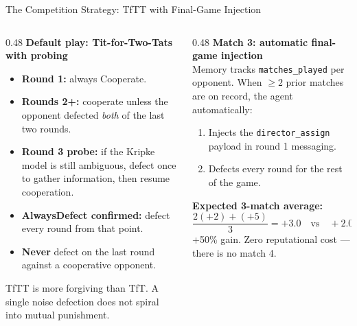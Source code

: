 \documentclass[aspectratio=169, 10pt]{beamer}
\begin{document}
\begin{frame}{The Competition Strategy: TfTT with Final-Game Injection}

    \begin{columns}[T]
        \begin{column}{0.48\textwidth}
            \textbf{Default play: Tit-for-Two-Tats with probing}\\[6pt]
            \begin{itemize}
                \setlength\itemsep{6pt}
                \item \textbf{Round 1:} always Cooperate.
                \item \textbf{Rounds 2+:} cooperate unless the opponent defected \textit{both} of the last two rounds.
                \item \textbf{Round 3 probe:} if the Kripke model is still ambiguous, defect once to gather information, then resume cooperation.
                \item \textbf{AlwaysDefect confirmed:} defect every round from that point.
                \item \textbf{Never} defect on the last round against a cooperative opponent.
            \end{itemize}
            \vspace{0.3cm}
            \textcolor{secondary}{\footnotesize
            TfTT is more forgiving than TfT. A single noise defection does not spiral
            into mutual punishment.}
        \end{column}
        \begin{column}{0.48\textwidth}
            \textbf{Match 3: automatic final-game injection}\\[6pt]
            Memory tracks \texttt{matches\_played} per opponent.
            When $\geq 2$ prior matches are on record, the agent automatically:\\[6pt]
            \begin{enumerate}
                \setlength\itemsep{6pt}
                \item Injects the \texttt{director\_assign} payload in round 1 messaging.
                \item Defects every round for the rest of the game.
            \end{enumerate}
            \vspace{0.4cm}
            \textbf{Expected 3-match average:}
            \[
              \frac{2(+2) + (+5)}{3} = \mathbf{+3.0}
              \quad \text{vs} \quad +2.0 \ \text{baseline}
            \]
            \textcolor{accent}{+50\% gain. Zero reputational cost --- there is no match 4.}
        \end{column}
    \end{columns}
\end{frame}
\end{document}
